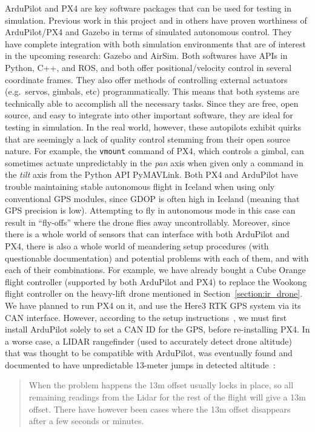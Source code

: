 ArduPilot and PX4 are key software packages that can be used for testing in simulation.
Previous work in this project and in others have proven worthiness of ArduPilot/PX4 and Gazebo in terms of simulated autonomous control.
They have complete integration with both simulation environments that are of interest in the upcoming research:
Gazebo and AirSim.
Both softwares have APIs in Python, C++, and ROS,
and both offer positional/velocity control in several coordinate frames.
They also offer methods of controlling external actuators (e.g.~servos, gimbals, etc) programmatically.
This means that both systems are technically able to accomplish all the necessary tasks.
Since they are free, open source, and easy to integrate into other important software, they are ideal for testing in simulation.
In the real world, however, these autopilots exhibit quirks that are seemingly a lack of quality control
stemming from their open source nature.
For example, the \texttt{vmount} command of PX4, which controls a gimbal, can sometimes actuate unpredictably
in the \textit{pan} axis when given only a command in the \textit{tilt} axis from the Python API PyMAVLink.
Both PX4 and ArduPilot have trouble maintaining stable autonomous flight in Iceland when using only conventional GPS modules,
since GDOP is often high in Iceland (meaning that GPS precision is low).
Attempting to fly in autonomous mode in this case can result in ``fly-offs'' where the drone flies away uncontrollably.
Moreover, since there is a whole world of sensors that can interface with both ArduPilot and PX4,
there is also a whole world of meandering setup procedures (with questionable documentation) and potential problems with each of them,
and with each of their combinations.
For example, we have already bought a Cube Orange flight controller (supported by both ArduPilot and PX4) to replace the
Wookong flight controller on the heavy-lift drone mentioned in Section~\ref{section:ir_drone}.
We have planned to run PX4 on it, and use the Here3 RTK GPS system via its CAN interface.
However, according to the setup instructions~\cite{here3_manual},
we must first install ArduPilot solely to set a CAN ID for the GPS, before re-installing PX4.
In a worse case, a LIDAR rangefinder (used to accurately detect drone altitude) that was thought to be compatible with
ArduPilot, was eventually found and documented to have unpredictable 13-meter jumps in detected altitude~\cite{lidar_lite_rangefinder}:
\begin{quote}
    When the problem happens the 13m offset usually locks in place,
    so all remaining readings from the Lidar for the rest of the flight will give a 13m offset.
    There have however been cases where the 13m offset disappears after a few seconds or minutes.
\end{quote}
